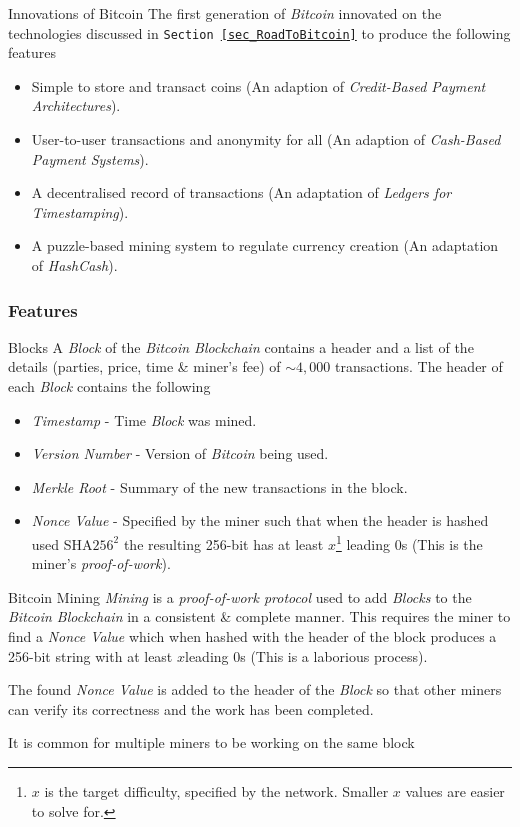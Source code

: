 \documentclass[11pt,a4paper]{article}
\begin{document}
  \begin{proposition}{Innovations of Bitcoin}
    The first generation of \textit{Bitcoin} innovated on the technologies discussed in \texttt{Section \ref{sec_RoadToBitcoin}} to produce the following features
    \begin{itemize}
      \item Simple to store and transact coins (An adaption of \textit{Credit-Based Payment Architectures}).
      \item User-to-user transactions and anonymity for all (An adaption of \textit{Cash-Based Payment Systems}).
      \item A decentralised record of transactions (An adaptation of \textit{Ledgers for Timestamping}).
      \item A puzzle-based mining system to regulate currency creation (An adaptation of \textit{HashCash}).
    \end{itemize}
  \end{proposition}

\subsubsection*{Features}

  \begin{definition}{Blocks}
    A \textit{Block} of the \textit{Bitcoin Blockchain} contains a header and a list of the details (parties, price, time \& miner's fee) of $\sim4,000$ transactions. The header of each \textit{Block} contains the following
    \begin{itemize}
      \item \textit{Timestamp} - Time \textit{Block} was mined.
      \item \textit{Version Number} - Version of \textit{Bitcoin} being used.
      \item \textit{Merkle Root} - Summary of the new transactions in the block.
      \item \textit{Nonce Value} - Specified by the miner such that when the header is hashed used SHA$256^2$ the resulting 256-bit has at least $x$\footnote{$x$ is the target difficulty, specified by the network. Smaller $x$ values are easier to solve for.\label{foot_nonceX}} leading $0$s (This is the miner's \textit{proof-of-work}).
    \end{itemize}
  \end{definition}

  \begin{definition}{Bitcoin Mining}
    \textit{Mining} is a \textit{proof-of-work protocol} used to add \textit{Blocks} to the \textit{Bitcoin Blockchain} in a consistent \& complete manner. This requires the miner to find a \textit{Nonce Value} which when hashed with the header of the block produces a 256-bit string with at least $x$\footnotemark[\ref{foot_nonceX}] leading $0$s (This is a laborious process).
    \par The found \textit{Nonce Value} is added to the header of the \textit{Block} so that other miners can verify its correctness and the work has been completed.
    \par It is common for multiple miners to be working on the same block
  \end{definition}
\end{document}
